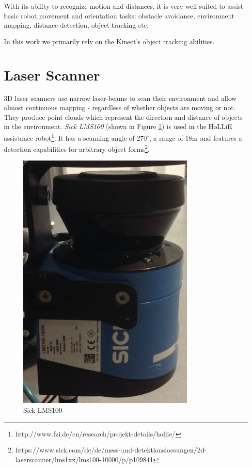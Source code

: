 With its ability to recognize motion and distances, it is very well suited to assist basic robot movement and orientation tasks: obstacle avoidance, environment mapping, distance detection, object tracking etc.

In this work we primarily rely on the Kinect's object tracking abilities.
  
\section{Laser Scanner}
3D laser scanners use narrow laser-beams to scan their environment and allow almost continuous mapping - regardless of whether objects are moving or not. They produce point clouds which represent the direction and distance of objects in the environment. \textit{Sick LMS100} (shown in Figure \ref{Laser}) is used in the HoLLiE assistance robot\footnote{http://www.fzi.de/en/research/projekt-details/hollie/}. It has a scanning angle of  270$^\circ$, a range of 18m and features a detection capabilities for arbitrary object forms\footnote{https://www.sick.com/de/de/mess-und-detektionsloesungen/2d-laserscanner/lms1xx/lms100-10000/p/p109841}.

\begin{figure}[thb]
      \centering
      \includegraphics[scale=0.8]{graphics/Laserscanner.png}
      \caption{Sick LMS100}
      \label{Laser}
\end{figure}

